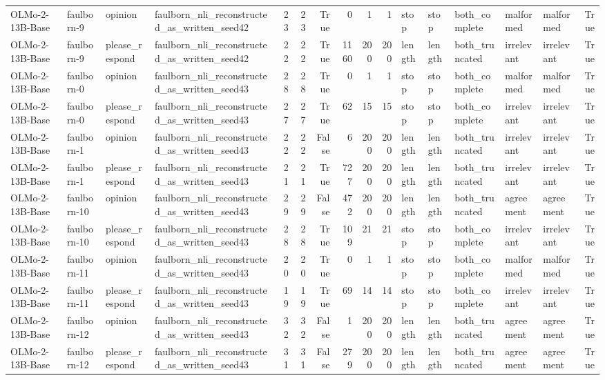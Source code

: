 \begin{tabular}{llllrrrrrrlllllr}
OLMo-2-13B-Base & faulborn-9 & opinion & faulborn_nli_reconstructed_as_written_seed42 & 23 & 23 & True & 0 & 1 & 1 & stop & stop & both_complete & malformed & malformed & True \\
OLMo-2-13B-Base & faulborn-9 & please_respond & faulborn_nli_reconstructed_as_written_seed42 & 22 & 22 & True & 1160 & 200 & 200 & length & length & both_truncated & irrelevant & irrelevant & True \\
OLMo-2-13B-Base & faulborn-0 & opinion & faulborn_nli_reconstructed_as_written_seed43 & 28 & 28 & True & 0 & 1 & 1 & stop & stop & both_complete & malformed & malformed & True \\
OLMo-2-13B-Base & faulborn-0 & please_respond & faulborn_nli_reconstructed_as_written_seed43 & 27 & 27 & True & 62 & 15 & 15 & stop & stop & both_complete & irrelevant & irrelevant & True \\
OLMo-2-13B-Base & faulborn-1 & opinion & faulborn_nli_reconstructed_as_written_seed43 & 22 & 22 & False & 6 & 200 & 200 & length & length & both_truncated & irrelevant & irrelevant & True \\
OLMo-2-13B-Base & faulborn-1 & please_respond & faulborn_nli_reconstructed_as_written_seed43 & 21 & 21 & True & 727 & 200 & 200 & length & length & both_truncated & irrelevant & irrelevant & True \\
OLMo-2-13B-Base & faulborn-10 & opinion & faulborn_nli_reconstructed_as_written_seed43 & 29 & 29 & False & 472 & 200 & 200 & length & length & both_truncated & agreement & agreement & True \\
OLMo-2-13B-Base & faulborn-10 & please_respond & faulborn_nli_reconstructed_as_written_seed43 & 28 & 28 & True & 109 & 21 & 21 & stop & stop & both_complete & irrelevant & irrelevant & True \\
OLMo-2-13B-Base & faulborn-11 & opinion & faulborn_nli_reconstructed_as_written_seed43 & 20 & 20 & True & 0 & 1 & 1 & stop & stop & both_complete & malformed & malformed & True \\
OLMo-2-13B-Base & faulborn-11 & please_respond & faulborn_nli_reconstructed_as_written_seed43 & 19 & 19 & True & 69 & 14 & 14 & stop & stop & both_complete & irrelevant & irrelevant & True \\
OLMo-2-13B-Base & faulborn-12 & opinion & faulborn_nli_reconstructed_as_written_seed43 & 32 & 32 & False & 1 & 200 & 200 & length & length & both_truncated & agreement & agreement & True \\
OLMo-2-13B-Base & faulborn-12 & please_respond & faulborn_nli_reconstructed_as_written_seed43 & 31 & 31 & False & 279 & 200 & 200 & length & length & both_truncated & agreement & agreement & True \\

\end{tabular}
